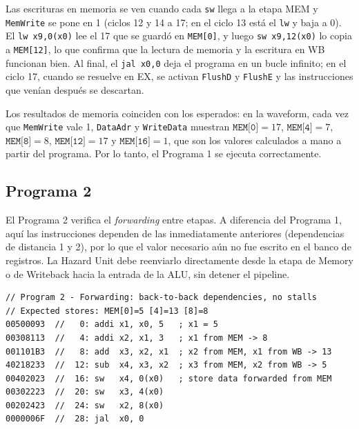 \documentclass[12pt,a4paper]{article}
\begin{document}
Las escrituras en memoria se ven cuando cada \texttt{sw} llega a la etapa MEM y \texttt{MemWrite} se pone en 1 (ciclos 12 y 14 a 17; en el ciclo 13 está el \texttt{lw} y baja a 0). El \texttt{lw x9,0(x0)} lee el 17 que se guardó en \texttt{MEM[0]}, y luego \texttt{sw x9,12(x0)} lo copia a \texttt{MEM[12]}, lo que confirma que la lectura de memoria y la escritura en WB funcionan bien. Al final, el \texttt{jal x0,0} deja el programa en un bucle infinito; en el ciclo 17, cuando se resuelve en EX, se activan \texttt{FlushD} y \texttt{FlushE} y las instrucciones que venían después se descartan.


Los resultados de memoria coinciden con los esperados: en la waveform, cada vez que \texttt{MemWrite} vale 1, \texttt{DataAdr} y \texttt{WriteData} muestran $\texttt{MEM[0]}=17$, $\texttt{MEM[4]}=7$, $\texttt{MEM[8]}=8$, $\texttt{MEM[12]}=17$ y $\texttt{MEM[16]}=1$, que son los valores calculados a mano a partir del programa. Por lo tanto, el Programa 1 se ejecuta correctamente.




\subsection{Programa 2}


El Programa 2 verifica el \textit{forwarding} entre etapas. A diferencia
del Programa 1, aquí las instrucciones dependen de las inmediatamente
anteriores (dependencias de distancia 1 y 2), por lo que el valor
necesario aún no fue escrito en el banco de registros. La Hazard Unit
debe reenviarlo directamente desde la etapa de Memory o de Writeback hacia
la entrada de la ALU, sin detener el pipeline.

\begin{lstlisting}[style=programa, caption={Programa 2: Forwarding (\texttt{pipeline/forwarding.mem}).}, label={lst:p2}]
// Program 2 - Forwarding: back-to-back dependencies, no stalls
// Expected stores: MEM[0]=5 [4]=13 [8]=8
00500093  //   0: addi x1, x0, 5   ; x1 = 5
00308113  //   4: addi x2, x1, 3   ; x1 from MEM -> 8
001101B3  //   8: add  x3, x2, x1  ; x2 from MEM, x1 from WB -> 13
40218233  //  12: sub  x4, x3, x2  ; x3 from MEM, x2 from WB -> 5
00402023  //  16: sw   x4, 0(x0)   ; store data forwarded from MEM
00302223  //  20: sw   x3, 4(x0)
00202423  //  24: sw   x2, 8(x0)
0000006F  //  28: jal  x0, 0
\end{lstlisting}
\end{document}
